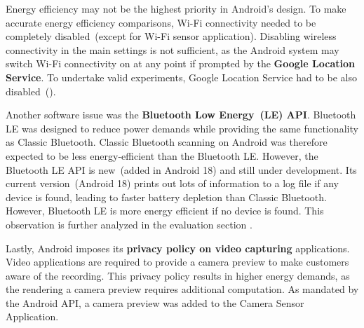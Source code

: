 Energy efficiency may not be the highest priority in Android's design. To make accurate energy efficiency comparisons, Wi-Fi connectivity needed to be completely disabled\ (except for Wi-Fi sensor application). Disabling wireless connectivity in the main settings is not sufficient, as the Android system may switch Wi-Fi connectivity on at any point if prompted by the \textbf{Google Location Service}. To undertake valid experiments, Google Location Service had to be also disabled\ (). 


Another software issue was the \textbf{Bluetooth Low Energy\ (LE) API}. Bluetooth LE was designed to reduce power demands while providing the same functionality as Classic Bluetooth. Classic Bluetooth scanning on Android was therefore expected to be less energy-efficient than the Bluetooth LE. However, the Bluetooth LE API is new\ (added in Android 18) and still under development. Its current version\ (Android 18) prints out lots of information to a log file if any device is found, leading to faster battery depletion than Classic Bluetooth. However, Bluetooth LE is more energy efficient if no device is found. This observation is further analyzed in the evaluation section . 

Lastly, Android imposes its \textbf{privacy policy on video capturing} applications. Video applications are required to provide a camera preview to make customers aware of the recording. This privacy policy results in higher energy demands, as the rendering a camera preview requires additional computation. As mandated by the Android API, a camera preview was added to the Camera Sensor Application.
		
